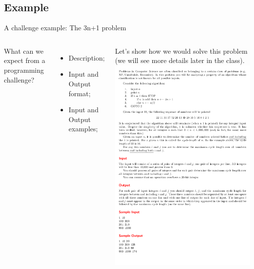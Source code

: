 \subsection{Example}
\begin{frame}{A challenge example: The 3n+1 problem}
  \begin{columns}
      What can we expect from a programming challenge?
      \begin{itemize}
        \item Description;
        \item Input and Output format;
        \item Input and Output examples;
      \end{itemize}
      \bigskip

      Let's show how we would solve this problem (we will see more details
      later in the class).
    \includegraphics[width=1\textwidth]{img/3n_problem}
  \end{columns}
\end{frame}

